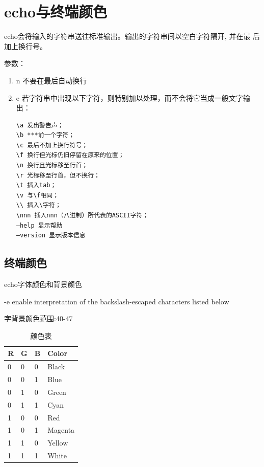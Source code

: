 
\section{echo与终端颜色}
\label{sec:echoCmd}

echo会将输入的字符串送往标准输出。输出的字符串间以空白字符隔开, 并在最
后加上换行号。

参数：

\begin{enumerate}[itemsep=0pt,parsep=0pt]
\item \-n 不要在最后自动换行 
\item \-e 若字符串中出现以下字符，则特别加以处理，而不会将它当成一般文字输出： 
\begin{verbatim}
\a 发出警告声； 
\b ***前一个字符； 
\c 最后不加上换行符号； 
\f 换行但光标仍旧停留在原来的位置； 
\n 换行且光标移至行首； 
\r 光标移至行首，但不换行； 
\t 插入tab； 
\v 与\f相同； 
\\ 插入\字符； 
\nnn 插入nnn（八进制）所代表的ASCII字符； 
–help 显示帮助 
–version 显示版本信息
\end{verbatim}
\end{enumerate}

\subsection{终端颜色}

echo字体颜色和背景颜色 

-e enable interpretation of the backslash-escaped characters listed below 

字背景颜色范围:40-47

\begin{table}[!htbp]
  \centering
  \begin{tabular}{llll}
    \toprule
    R & G & B & Color \\
    \midrule
    0 & 0 & 0 & Black \\
    0 & 0 & 1 & Blue \\
    0 & 1 & 0 & Green \\
    0 & 1 & 1 & Cyan \\
    1 & 0 & 0 & Red \\
    1 & 0 & 1 & Magenta \\
    1 & 1 & 0 & Yellow \\
    1 & 1 & 1 & White \\
    \bottomrule
  \end{tabular}
  \caption{颜色表\cite{computersystem}}
  \label{tab:colorTable}
\end{table}

